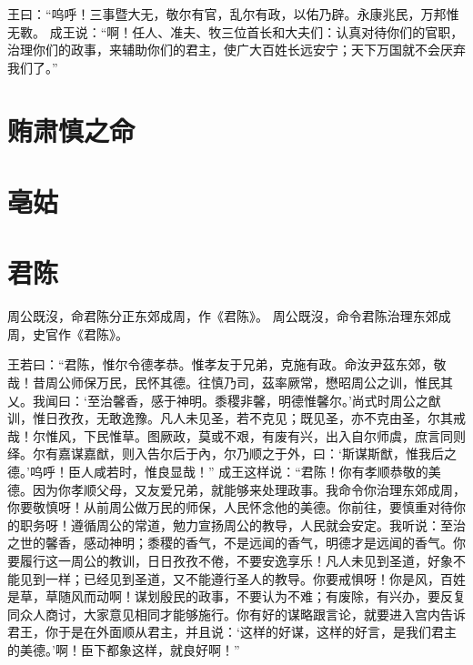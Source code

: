 \documentclass[a4paper,12pt,UTF8,twoside]{ctexbook}
\begin{document}
王曰：“呜呼！三事暨大无，敬尔有官，乱尔有政，以佑乃辟。永康兆民，万邦惟无斁。
成王说：“啊！任人、准夫、牧三位首长和大夫们：认真对待你们的官职，治理你们的政事，来辅助你们的君主，使广大百姓长远安宁；天下万国就不会厌弃我们了。”

\chapter{贿肃慎之命}

\chapter{亳姑}

\chapter{君陈}

周公既沒，命君陈分正东郊成周，作《君陈》。
周公既沒，命令君陈治理东郊成周，史官作《君陈》。

王若曰：“君陈，惟尔令德孝恭。惟孝友于兄弟，克施有政。命汝尹茲东郊，敬哉！昔周公师保万民，民怀其德。往慎乃司，茲率厥常，懋昭周公之训，惟民其乂。我闻曰：‘至治馨香，感于神明。黍稷非馨，明德惟馨尔。’尚式时周公之猷训，惟日孜孜，无敢逸豫。凡人未见圣，若不克见；既见圣，亦不克由圣，尔其戒哉！尔惟风，下民惟草。图厥政，莫或不艰，有废有兴，出入自尔师虞，庶言同则绎。尔有嘉谋嘉猷，则入告尔后于內，尔乃顺之于外，曰：‘斯谋斯猷，惟我后之德。’呜呼！臣人咸若时，惟良显哉！”
成王这样说：“君陈！你有孝顺恭敬的美德。因为你孝顺父母，又友爱兄弟，就能够来处理政事。我命令你治理东郊成周，你要敬慎呀！从前周公做万民的师保，人民怀念他的美德。你前往，要慎重对待你的职务呀！遵循周公的常道，勉力宣扬周公的教导，人民就会安定。我听说：至治之世的馨香，感动神明；黍稷的香气，不是远闻的香气，明德才是远闻的香气。你要履行这一周公的教训，日日孜孜不倦，不要安逸享乐！凡人未见到圣道，好象不能见到一样；已经见到圣道，又不能遵行圣人的教导。你要戒惧呀！你是风，百姓是草，草随风而动啊！谋划殷民的政事，不要认为不难；有废除，有兴办，要反复同众人商讨，大家意见相同才能够施行。你有好的谋略跟言论，就要进入宫内告诉君王，你于是在外面顺从君主，并且说：‘这样的好谋，这样的好言，是我们君主的美德。’啊！臣下都象这样，就良好啊！”
\end{document}
